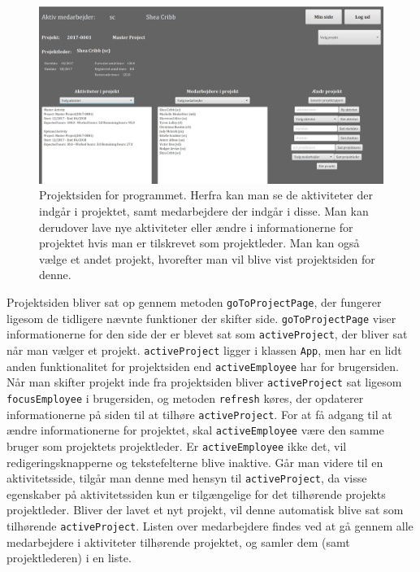 \begin{figure}[H]
    \centering
    \includegraphics[width = \textwidth]{Figurer/projectPage}
    \caption{Projektsiden for programmet. Herfra kan man se de aktiviteter der indgår i projektet, samt medarbejdere der indgår i disse. Man kan derudover lave nye aktiviteter eller ændre i informationerne for projektet hvis man er tilskrevet som projektleder. Man kan også vælge et andet projekt, hvorefter man vil blive vist projektsiden for denne.}
    \label{fig:projectPage}
\end{figure}

Projektsiden bliver sat op gennem metoden \texttt{goToProjectPage}, der fungerer ligesom de tidligere nævnte funktioner der skifter side. \texttt{goToProjectPage} viser informationerne for den side der er blevet sat som \texttt{activeProject}, der bliver sat når man vælger et projekt. \texttt{activeProject} ligger i klassen \texttt{App}, men har en lidt anden funktionalitet for projektsiden end \texttt{activeEmployee} har for brugersiden. Når man skifter projekt inde fra projektsiden bliver \texttt{activeProject} sat ligesom \texttt{focusEmployee} i brugersiden, og metoden \texttt{refresh} køres, der opdaterer informationerne på siden til at tilhøre \texttt{activeProject}. For at få adgang til at ændre informationerne for projektet, skal \texttt{activeEmployee} være den samme bruger som projektets projektleder. Er \texttt{activeEmployee} ikke det, vil redigeringsknapperne og tekstefelterne blive inaktive. Går man videre til en aktivitetsside, tilgår man denne med hensyn til \texttt{activeProject}, da visse egenskaber på aktivitetssiden kun er tilgængelige for det tilhørende projekts projektleder. Bliver der lavet et nyt projekt, vil denne automatisk blive sat som tilhørende \texttt{activeProject}. Listen over medarbejdere findes ved at gå gennem alle medarbejdere i aktiviteter tilhørende projektet, og samler dem (samt projektlederen) i en liste.

